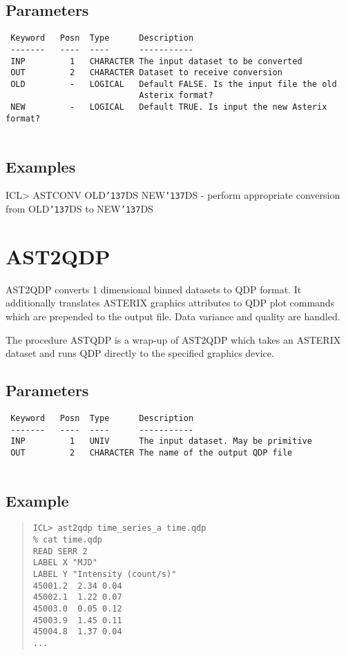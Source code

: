 \documentclass{book}
\renewcommand{\_}{{\tt\char'137}}     %
\begin{document}
\subsection{Parameters}
\begin{verbatim}
 Keyword   Posn  Type      Description
 -------   ----  ----      -----------
 INP         1   CHARACTER The input dataset to be converted
 OUT         2   CHARACTER Dataset to receive conversion
 OLD         -   LOGICAL   Default FALSE. Is the input file the old
                           Asterix format?
 NEW         -   LOGICAL   Default TRUE. Is input the new Asterix format?
 
\end{verbatim}\subsection{Examples}
ICL> ASTCONV OLD\_DS NEW\_DS - perform appropriate conversion
from OLD\_DS to NEW\_DS
\section{AST2QDP}
AST2QDP converts 1 dimensional binned datasets to QDP format. It
additionally translates ASTERIX graphics attributes to QDP plot
commands which are prepended to the output file. Data variance and
quality are handled.
 
The procedure ASTQDP is a wrap-up of AST2QDP which takes an
ASTERIX dataset and runs QDP directly to the specified graphics
device.
 
\subsection{Parameters}
\begin{verbatim}
 Keyword   Posn  Type      Description
 -------   ----  ----      -----------
 INP         1   UNIV      The input dataset. May be primitive
 OUT         2   CHARACTER The name of the output QDP file
 
\end{verbatim}\subsection{Example}
\begin{quote}\begin{verbatim}
ICL> ast2qdp time_series_a time.qdp
% cat time.qdp
READ SERR 2
LABEL X "MJD"
LABEL Y "Intensity (count/s)"
45001.2  2.34 0.04
45002.1  1.22 0.07
45003.0  0.05 0.12
45003.9  1.45 0.11
45004.8  1.37 0.04
...
\end{verbatim}\end{quote}
\end{document}
